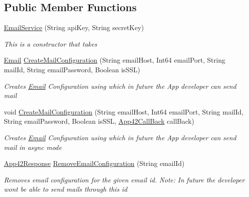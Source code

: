 \subsection*{Public Member Functions}
\begin{DoxyCompactItemize}
\item 
\hyperlink{classcom_1_1shephertz_1_1app42_1_1paas_1_1sdk_1_1csharp_1_1email_1_1_email_service_aebc988f5201546207ca7bebcc39f061c}{Email\+Service} (String api\+Key, String secret\+Key)
\begin{DoxyCompactList}\small\item\em This is a constructor that takes \end{DoxyCompactList}\item 
\hyperlink{classcom_1_1shephertz_1_1app42_1_1paas_1_1sdk_1_1csharp_1_1email_1_1_email}{Email} \hyperlink{classcom_1_1shephertz_1_1app42_1_1paas_1_1sdk_1_1csharp_1_1email_1_1_email_service_a7d35c7c895039cae4d181c9cffc5e37c}{Create\+Mail\+Configuration} (String email\+Host, Int64 email\+Port, String mail\+Id, String email\+Password, Boolean is\+S\+S\+L)
\begin{DoxyCompactList}\small\item\em Creates \hyperlink{classcom_1_1shephertz_1_1app42_1_1paas_1_1sdk_1_1csharp_1_1email_1_1_email}{Email} Configuration using which in future the App developer can send mail \end{DoxyCompactList}\item 
void \hyperlink{classcom_1_1shephertz_1_1app42_1_1paas_1_1sdk_1_1csharp_1_1email_1_1_email_service_a74ab16964c68e47f8c550d551f0d8ed7}{Create\+Mail\+Configuration} (String email\+Host, Int64 email\+Port, String mail\+Id, String email\+Password, Boolean is\+S\+S\+L, \hyperlink{interfacecom_1_1shephertz_1_1app42_1_1paas_1_1sdk_1_1csharp_1_1_app42_call_back}{App42\+Call\+Back} call\+Back)
\begin{DoxyCompactList}\small\item\em Creates \hyperlink{classcom_1_1shephertz_1_1app42_1_1paas_1_1sdk_1_1csharp_1_1email_1_1_email}{Email} Configuration using which in future the App developer can send mail in async mode \end{DoxyCompactList}\item 
\hyperlink{classcom_1_1shephertz_1_1app42_1_1paas_1_1sdk_1_1csharp_1_1_app42_response}{App42\+Response} \hyperlink{classcom_1_1shephertz_1_1app42_1_1paas_1_1sdk_1_1csharp_1_1email_1_1_email_service_a1652d5cd43deeabc9fca4a04d6d91b94}{Remove\+Email\+Configuration} (String email\+Id)
\begin{DoxyCompactList}\small\item\em Removes email configuration for the given email id. Note\+: In future the developer wont be able to send mails through this id \end{DoxyCompactList}\item 

\end{DoxyCompactItemize}
